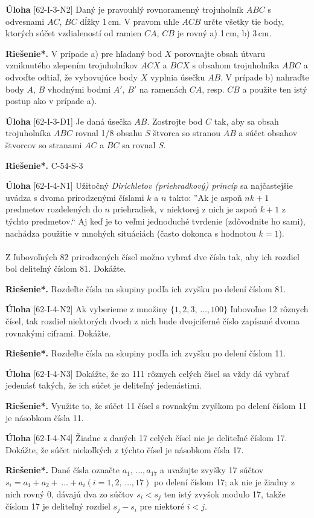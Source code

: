 \documentclass{article}
\newcommand{\rieh}{\textbf{Riešenie*.} }
\newcommand{\problem}[4]{
  \begin{tcolorbox}[breakable,notitle,boxrule=0pt,colback=light-gray,colframe=light-gray]
    \textbf{Úloha}
    [#1] #3
  \end{tcolorbox}
  \noindent#4
}
\begin{document}
\problem{62-I-3-N2}{}{
Daný je pravouhlý rovnoramenný trojuholník $ABC$ s odvesnami $AC$, $BC$ dĺžky 1\,cm. V pravom uhle $ACB$ určte všetky tie body, ktorých súčet vzdialeností od ramien $CA$, $CB$ je rovný a) 1\,cm, b) 3\,cm.
}{
\rieh V prípade a) pre hľadaný bod $X$ porovnajte obsah útvaru vzniknutého zlepením trojuholníkov $ACX$ a $BCX$ s obsahom trojuholníka $ABC$ a odvoďte odtiaľ, že vyhovujúce body $X$ vyplnia úsečku $AB$. V prípade b) nahraďte body $A$, $B$ vhodnými bodmi $A'$, $B'$ na ramenách $CA$, resp. $CB$ a použite ten istý postup ako v prípade a).
}

\problem{62-I-3-D1}{}{
Je daná úsečka $AB$. Zostrojte bod $C$ tak, aby sa obsah trojuholníka $ABC$ rovnal 1/8 obsahu $S$ štvorca so stranou $AB$ a súčet obsahov štvorcov so stranami $AC$ a $BC$ sa rovnal $S$.
}{
\rieh C-54-S-3
}

\problem{62-I-4-N1}{}{
Užitočný \textit{Dirichletov (priehradkový) princíp} sa najčastejšie uvádza s dvoma prirodzenými číslami $k$ a $n$ takto: ”Ak je aspoň $nk+1$ predmetov rozdelených do $n$ priehradiek, v niektorej z nich je aspoň $k + 1$ z týchto predmetov.“ Aj keď je to veľmi jednoduché tvrdenie (zdôvodnite ho sami), nachádza použitie v mnohých situáciách (často dokonca s hodnotou $k = 1$).\\
\\
Z ľubovoľných 82 prirodzených čísel možno vybrať dve čísla tak, aby ich rozdiel bol deliteľný číslom 81. Dokážte.
}{
\rieh Rozdeľte čísla na skupiny podľa ich zvyšku po delení číslom 81.
}


\problem{62-I-4-N2}{}{
Ak vyberieme z množiny $\{1, 2, 3,\,\ldots , 100\}$ ľubovoľne 12 rôznych čísel, tak rozdiel niektorých dvoch z nich bude dvojciferné číslo zapísané dvoma rovnakými ciframi. Dokážte.
}{
\rieh Rozdeľte čísla na skupiny podľa ich zvyšku po delení číslom 11.
}


\problem{62-I-4-N3}{}{
Dokážte, že zo 111 rôznych celých čísel sa vždy dá vybrať jedenásť takých, že ich súčet je deliteľný jedenástimi.
}{
\rieh Využite to, že súčet 11 čísel s rovnakým zvyškom po delení číslom 11 je násobkom čísla 11.
}


\problem{62-I-4-N4}{}{
Žiadne z daných 17 celých čísel nie je deliteľné číslom 17. Dokážte, že súčet niekoľkých z týchto čísel je násobkom čísla 17.
}{
\rieh Dané čísla označte $a_1,\,\ldots, a_{17}$ a uvažujte zvyšky 17 súčtov $s_i = a_1 + a_2 +\,\ldots + a_i (i = 1, 2,\,\ldots, 17)$ po delení číslom 17; ak nie je žiadny z nich rovný 0, dávajú dva zo súčtov $s_i < s_j$ ten istý zvyšok modulo 17, takže číslom 17 je deliteľný rozdiel $s_j - s_i$ pre niektoré $i < j$.
}
\end{document}
